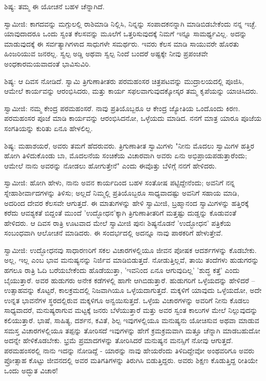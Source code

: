 ಶಿಷ್ಯ: ತಮ್ಮ ಈ ಯೋಚನೆ ಬಹಳ ಚೆನ್ನಾಗಿದೆ.

ಸ್ವಾಮೀಜಿ: ಕಾಗದವನ್ನು ಮಗ್ಗುಲಲ್ಲಿ ರಾಶಿಮಾಡಿ ನಿಲ್ಲಿಸಿ, ನಿನ್ನನ್ನು ಸಂಪಾದಕನನ್ನಾಗಿ ಮಾಡಿಬಿಡಬೇಕೆಂದು ನನ್ನ ಇಚ್ಛೆ. ಯಾವುದಾದರೂ ಒಂದು ಸ್ವಂತ ಕೆಲಸವನ್ನು ಮೂಲೆಗೆ ಒತ್ತರಿಸುವುದಕ್ಕೆ ನಿಮಗೆ ಇನ್ನೂ ಸಾಮರ್ಥ್ಯವಿಲ್ಲ. ಅದನ್ನು ಮಾಡುವುದಕ್ಕೆ ಈ ಸರ್ವತ್ಯಾಗಿಗಳಾದ ಸಾಧುಗಳೇ ಸಮರ್ಥರು. ಇವರು ಕೆಲಸ ಮಾಡಿ ಸಾಯುವರೇ ಹೊರತು ಹಿಂಜರಿಯುವ ಜನರಲ್ಲ. ಸ್ವಲ್ಪ ಅಡ್ಡಿ ಅಥವಾ ಸ್ವಲ್ಪ ನಿಂದೆ ಬಂದರೆ ಅಷ್ಟಕ್ಕೇ ನೀವು ಪ್ರಪಂಚವೇ ಅಂಧಕಾರಮಯವಾದಂತೆ ಭಾವಿಸುವಿರಿ.

ಶಿಷ್ಯ: ಆ ದಿವಸ ನೋಡಿದೆ. ಸ್ವಾಮಿ ತ್ರಿಗುಣಾತೀತರು ಪರಮಹಂಸರ ಚಿತ್ರಪಟವನ್ನು ಮುದ್ರಾಲಯದಲ್ಲಿ ಪೂಜಿಸಿ, ಆಮೇಲೆ ಕಾರ್ಯವನ್ನು ಆರಂಭಿಸಿದರು, ಮತ್ತು ಕಾರ್ಯ ಸಫಲವಾಗುವುದಕ್ಕೋಸ್ಕರ ತಮ್ಮ ಕೃಪೆಯನ್ನು ಯಾಚಿಸಿದರು.

ಸ್ವಾಮೀಜಿ: ನಮ್ಮ ಕೇಂದ್ರ ಪರಮಹಂಸರೆ. ನಾವು ಪ್ರತಿಯೊಬ್ಬರೂ ಆ ಕೇಂದ್ರ ಜ್ಯೋತಿಯ ಒಂದೊಂದು ಕಿರಣ. ಪರಮಹಂಸರ ಪೂಜೆ ಮಾಡಿ ಕಾರ್ಯವನ್ನು ಆರಂಭಿಸಿದನೋ, ಒಳ್ಳೆಯದು ಮಾಡಿದ. ನನಗೆ ಮಾತ್ರ ಯಾರೂ ಪೂಜೆಯ ಸಂಗತಿಯನ್ನು ಕುರಿತು ಏನೂ ಹೇಳಲಿಲ್ಲ.

ಶಿಷ್ಯ: ಮಹಾಶಯರೆ, ಅವರು ತಮಗೆ ಹೆದರುವರು. ತ್ರಿಗುಣಾತೀತ ಸ್ವಾಮಿಗಳು "ನೀನು ಮೊದಲು ಸ್ವಾಮಿಗಳ ಹತ್ತಿರ ಹೋಗಿ ತಿಳಿದುಕೊಂಡು ಬಾ, ಮೊದಲನೆಯ ಸಂಚಿಕೆಯ ವಿಚಾರವಾಗಿ ಅವರು ಏನು ಅಭಿಪ್ರಾಯಪಡುತ್ತಾರೆಂದು; ಆಮೇಲೆ ನಾನು ಅವರನ್ನು ನೋಡಲು ಹೋಗುತ್ತೇನೆ" ಎಂದು ಈವೊತ್ತು ಬೆಳಿಗ್ಗೆ ನನಗೆ ಹೇಳಿದರು.

ಸ್ವಾಮೀಜಿ: ಹೋಗಿ ಹೇಳು, ನಾನು ಅವನ ಕಾರ್ಯದಿಂದ ಬಹಳ ಸಂತೋಷ ಪಟ್ಟಿದ್ದೇನೆಂದು; ಅವನಿಗೆ ನನ್ನ ಸ್ನೇಹಾಶೀರ್ವಾದಗಳನ್ನು ತಿಳಿಸು; ಅಲ್ಲದೆ ನಿಮ್ಮಲ್ಲಿ ಪ್ರತಿಯೊಬ್ಬರೂ ಸಾಧ್ಯವಾದಷ್ಟು ಅವನಿಗೆ ಸಹಾಯ ಮಾಡಿ, ಅದರಿಂದ ದೇವರ ಕೆಲಸವೇ ಆಗುತ್ತದೆ. ಈ ಮಾತುಗಳನ್ನು ಹೇಳಿ ಸ್ವಾಮೀಜಿ, ಬ್ರಹ್ಮಾನಂದ ಸ್ವಾಮಿಗಳನ್ನು ಹತ್ತಿರಕ್ಕೆ ಕರೆದು ಆವಶ್ಯಕತೆ ಬಿದ್ದಂತೆ ಮುಂದೆ 'ಉದ್ಭೋಧನ'ಕ್ಕಾಗಿ ತ್ರಿಗುಣಾತೀತರಿಗೆ ಮತ್ತಷ್ಟು ದುಡ್ಡನ್ನು ಕೊಡುವಂತೆ ಹೇಳಿದರು. ಆ ದಿವಸ ರಾತ್ರಿ ಊಟವಾದ ಮೇಲೆ ಸ್ವಾಮೀಜಿ ಪುನಃ ಶಿಷ್ಯನೊಡನೆ 'ಉದ್ಭೋಧನ' ಪತ್ರಿಕೆಯ ಸಂಬಂಧವಾಗಿ ಆಲೋಚನೆ ಮಾಡಿದರು. ಈ ಸಂದರ್ಭದಲ್ಲಿ ಅದನ್ನೂ ನಾವು ಪಾಠಕರಿಗೆ ಹೇಳುತ್ತೇವೆ.

ಸ್ವಾಮೀಜಿ: ಉದ್ಭೋಧನವು ಸಾಧಾರಣರಿಗೆ ಸಕಲ ವಿಚಾರಗಳಲ್ಲಿಯೂ ಜೀವನ ಪೋಷಕ ಆದರ್ಶಗಳನ್ನು ಕೊಡಬೇಕು. ಅಲ್ಲ, ಇಲ್ಲ ಎಂಬ ಭಾವ ಮನುಷ್ಯನನ್ನು ನಿರ್ಜಿವ ಮಾಡಿಬಿಡುತ್ತದೆ. ನೋಡುತ್ತಿಲ್ಲವೆ, ತಾಯಿ ತಂದೆಗಳು ಹುಡುಗರನ್ನು ಹಗಲೂ ರಾತ್ರಿ ಓದಿ ಬರೆಯಬೇಕೆಂದು ಹೊಡೆಯುತ್ತಾ, 'ಇವನಿಂದ ಏನೂ ಆಗುವುದಿಲ್ಲ' 'ಶುದ್ಧ ಕತ್ತೆ' ಎಂದು ಬೈಯುತ್ತಾರೆ. ಅವರ ಹುಡುಗರು ಅನೇಕ ಕಡೆಗಳಲ್ಲಿ ಹಾಗೇ ಆಗಿಬಿಡುತ್ತಾರೆ. ಹುಡುಗರಿಗೆ ಒಳ್ಳೆಯದನ್ನು ಹೇಳಿದರೆ – ಉತ್ಸಾಹವನ್ನು ಕೊಟ್ಟರೆ, ಕಾಲಕ್ರಮದಲ್ಲಿ ನಿಜವಾಗಿಯೂ ಒಳ್ಳೆಯದಾಗುತ್ತದೆ. ಮಕ್ಕಳಿಗೆ ಯಾವುದು ಒಳ್ಳೆಯದೋ, ಅದೇ ಉನ್ನತ ಭಾವನೆಗಳ ಸ್ಥರದಲ್ಲಿರುವ ಮಕ್ಕಳಿಗೂ ಅನ್ವಯಿಸುತ್ತದೆ. ಒಳ್ಳೆಯ ವಿಚಾರಗಳನ್ನು ಅವರಿಗೆ ನೀನು ಕೊಡಲು ಸಾಧ್ಯವಾದರೆ, ಮನುಷ್ಯರಾಗುವ ಮಟ್ಟಕ್ಕೆ ಜನರು ಬೆಳೆಯುತ್ತಾರೆ ಮತ್ತು ಅವರ ಸ್ವಂತ ಕಾಲುಗಳ ಮೇಲೆ ನಿಲ್ಲುವುದನ್ನು ಕಲಿಯುತ್ತಾರೆ. ಭಾಷೆ, ಸಾಹಿತ್ಯ, ದರ್ಶನ, ಕವಿತೆ, ಶಿಲ್ಪ ಇವುಗಳಲ್ಲಿಯೂ ಮನುಷ್ಯನು ಯೋಚಿಸುವ ಅಥವಾ ಮಾಡುವ ಸಮಸ್ತ ವಿಚಾರಗಳಲ್ಲಿಯೂ ತಪ್ಪನ್ನು ತೋರಿಸದೆ ಇವುಗಳನ್ನು ಹೇಗೆ ಕ್ರಮಕ್ರಮವಾಗಿ ಮತ್ತೂ ಚೆನ್ನಾಗಿ ಮಾಡಬಹುದೋ ಅದನ್ನೇ ಹೇಳಿಕೊಡಬೇಕು. ಭ್ರಮೆ ಪ್ರಮಾದಗಳನ್ನು ತೋರಿಸಿದರೆ ಮನುಷ್ಯನ ಮನಸ್ಸಿಗೆ ನೋವು ಆಗುತ್ತದೆ. ಪರಮಹಂಸರಲ್ಲಿ ನಾನು ಇದನ್ನು ನೋಡಿದ್ದೆ - ಯಾರನ್ನು ನಾವು ಹೇಯರೆಂದು ತಿಳಿದಿದ್ದೇವೋ ಅಂಥವರಿಗೂ ಅವರು ಪ್ರೋತ್ಸಾಹ ಕೊಟ್ಟು ಜೀವನದಲ್ಲಿ ಅವರ ಮತಿಗತಿಗಳನ್ನು ತಿರುಗಿಸಿ ಬಿಡುತ್ತಿದ್ದರು. ಅವರು ಶಿಕ್ಷಣ ಕೊಡುತ್ತಿದ್ದ ರೀತಿಯೇ ಒಂದು ಅದ್ಭುತ ವಿಚಾರ!

